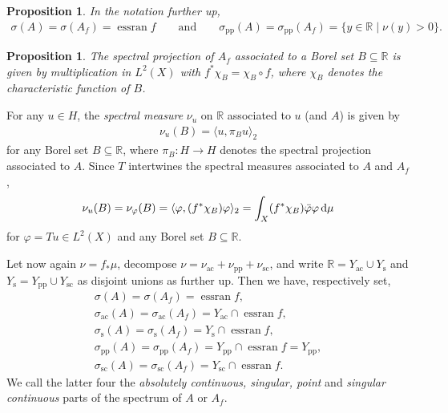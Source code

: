 \documentclass[pdftex]{sigma}
\numberwithin{equation}{section}
\newtheorem{Proposition}[Theorem]{Proposition}
\DeclareMathOperator{\essran}{essran}
\def\p{\mathrm{pp}}
\def\ac{\mathrm{ac}}
\def\sc{\mathrm{sc}}
\def\s{\mathrm s}
\def\R{\mathbb R}
\def\vf{\varphi}
\begin{document}
\begin{Proposition}\label{aaf}
In the notation further up,
\begin{align*}
	\sigma(A) = \sigma(A_f) = \essran f
	\qquad\text{and}\qquad
	\sigma_{\p}(A)=\sigma_{\p}(A_f)=\{y\in\R\mid\nu(y)>0\}.
\end{align*}
\end{Proposition}

\begin{Proposition}%
The spectral projection of $A_f$ associated to a Borel set $B\subseteq\R$
is given by multiplication in $L^2(X)$ with $f^*\chi_B=\chi_B\circ f$,
where $\chi_B$ denotes the characteristic function of $B$.
\end{Proposition}

For any $u\in H$,
the \emph{spectral measure} $\nu_u$ on $\R$ associated to $u$ (and $A$) is given by
\begin{align*}%
	\nu_u(B) = \langle u,\pi_Bu\rangle_2
\end{align*}
for any Borel set $B\subseteq\R$,
where $\pi_B\colon H\to H$ denotes the spectral projection associated to $A$.
Since $T$ intertwines the spectral measures associated to $A$ and $A_f$,
\begin{align*}%
	\nu_u(B) = \nu_\vf(B) = \langle\vf,(f^*\chi_B)\vf\rangle_2 = \int_X (f^*\chi_B)\bar\vf\vf\, {\rm d}\mu
\end{align*}
for $\vf=Tu\in L^2(X)$ and any Borel set $B\subseteq\R$.

Let now again $\nu=f_*\mu$, decompose $\nu=\nu_{\ac}+\nu_{\p}+\nu_{\sc}$,
and write $\R=Y_{\ac}\cup Y_{\s}$ and $Y_{\s}=Y_{\p}\cup Y_{\sc}$ as disjoint unions as further up.
Then we have, respectively set,
\begin{gather*}%
	\sigma(A) = \sigma(A_f) = \essran f,\\
	\sigma_{\ac}(A) =\sigma_{\ac}(A_f) = Y_{\ac}\cap\essran f,\\
	\sigma_{\s}(A) = \sigma_{\s}(A_f) = Y_{\s}\cap\essran f, \\
	\sigma_{\p}(A) = \sigma_{\p}(A_f) = Y_{\p}\cap\essran f = Y_{\p}, \\
	\sigma_{\sc}(A) = \sigma_{\sc}(A_f) = Y_{\sc}\cap\essran f.
\end{gather*}
We call the latter four the \emph{absolutely continuous, singular, point} and \emph{singular continuous}
parts of the spectrum of $A$ or $A_f$.
\end{document}
